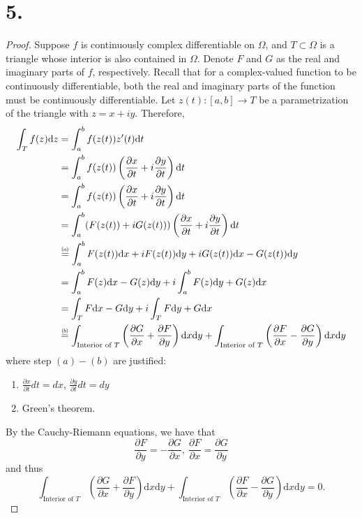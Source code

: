 \documentclass{article}
\newcommand\numeq[1]%
  {\stackrel{\scriptscriptstyle(\mkern-1.5mu#1\mkern-1.5mu)}{=}}
\begin{document}
\section*{5.}
\begin{proof}
  Suppose $f$ is continuously complex differentiable on $\Omega$, and $T \subset \Omega$ is a triangle whose interior is also contained in $\Omega$. Denote $F$ and $G$ as the real and imaginary parts of $f$, respectively. Recall that for a complex-valued function to be continuously differentiable, both the real and imaginary parts of the function must be continuously differentiable. Let $z(t):[a, b] \to T$ be a parametrization of the triangle with $z = x + iy$.  Therefore, 
  \begin{align*}
    \int_T f(z) \mathrm{d}z &= \int_a^b f(z(t)) z'(t) \mathrm{d}t\\ 
    &= \int_a^b f(z(t)) \left(\frac{\partial x}{\partial t} +i \frac{\partial y}{\partial t} \right) \mathrm{d}t\\
    &= \int_a^b f(z(t)) \left(\frac{\partial x}{\partial t} +i \frac{\partial y}{\partial t} \right) \mathrm{d}t\\
    &= \int_a^b (F(z(t)) +iG(z(t))) \left(\frac{\partial x}{\partial t} +i \frac{\partial y}{\partial t} \right) \mathrm{d}t\\ 
    &\numeq{a} \int_a^b F(z(t))\mathrm{d}x + iF(z(t)) \mathrm{d}y + iG(z(t)) \mathrm{d}x -G(z(t)) \mathrm{d}y\\
    &= \int_a^bF(z) \mathrm{d}x - G(z) \mathrm{d}y + i\int_a^b F(z) \mathrm{d}y + G(z) \mathrm{d}x \\
    &= \int_T F \mathrm{d}x - G \mathrm{d}y + i\int_T F \mathrm{d}y + G\mathrm{d}x\\
     &\numeq{b} \int_{\text{Interior of }T} \left(\frac{\partial G}{\partial x} + \frac{\partial F}{ \partial y} \right) \mathrm{d}x\mathrm{d}y + \int_{\text{Interior of }T} \left(\frac{\partial F}{\partial x}- \frac{\partial G}{\partial y} \right) \mathrm{d}x\mathrm{d}y
  \end{align*}
  where step $(a)-(b)$ are justified:
  \begin{enumerate}[\indent(a)] 
    \item $\frac{\partial x}{\partial t} dt = dx$, $\frac{\partial y}{\partial t} dt = dy$
    \item Green's theorem. 
  \end{enumerate} 
  By the Cauchy-Riemann equations, we have that 
  \[
  \frac{\partial F}{\partial y} = -\frac{\partial G}{\partial x} , \ \frac{\partial F}{ \partial x} = \frac{\partial G}{ \partial y}
  \]
  and thus 
  \[
    \int_{\text{Interior of }T} \left(\frac{\partial G}{\partial x} + \frac{\partial F}{ \partial y} \right) \mathrm{d}x\mathrm{d}y + \int_{\text{Interior of }T} \left(\frac{\partial F}{\partial x}- \frac{\partial G}{\partial y} \right) \mathrm{d}x \mathrm{d}y = 0. 
  \]


\end{proof}
\end{document}
